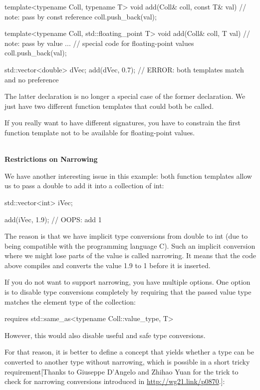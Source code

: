 \begin{cpp}
template<typename Coll, typename T>
void add(Coll& coll, const T& val) // note: pass by const reference
{
	coll.push_back(val);
}

template<typename Coll, std::floating_point T>
void add(Coll& coll, T val) // note: pass by value
{
	... // special code for floating-point values
	coll.push_back(val);
}

std::vector<double> dVec;
add(dVec, 0.7); // ERROR: both templates match and no preference
\end{cpp}

The latter declaration is no longer a special case of the former declaration. We just have two different function templates that could both be called.

If you really want to have different signatures, you have to constrain the first function template not to be available for floating-point values.

\noindent
\hspace*{\fill} \\ %
\textbf{Restrictions on Narrowing}

We have another interesting issue in this example: both function templates allow us to pass a double to add it into a collection of int:

\begin{cpp}
std::vector<int> iVec;

add(iVec, 1.9); // OOPS: add 1
\end{cpp}

The reason is that we have implicit type conversions from double to int (due to being compatible with the programming language C). Such an implicit conversion where we might lose parts of the value is called narrowing. It means that the code above compiles and converts the value 1.9 to 1 before it is inserted.

If you do not want to support narrowing, you have multiple options. One option is to disable type conversions completely by requiring that the passed value type matches the element type of the collection:

\begin{cpp}
requires std::same_as<typename Coll::value_type, T>
\end{cpp}

However, this would also disable useful and safe type conversions.

For that reason, it is better to define a concept that yields whether a type can be converted to another type without narrowing, which is possible in a short tricky requirement[Thanks to Giuseppe D’Angelo and Zhihao Yuan for the trick to check for narrowing conversions introduced in \url{http://wg21.link/p0870}.]:


